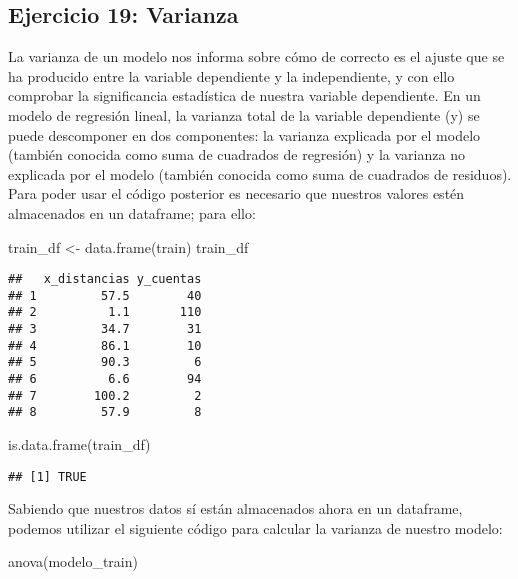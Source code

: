 \documentclass[
]{article}
\newenvironment{Shaded}{\begin{snugshade}}{\end{snugshade}}
\newcommand{\FunctionTok}[1]{\textcolor[rgb]{0.00,0.00,0.00}{#1}}
\newcommand{\NormalTok}[1]{#1}
\newcommand{\OtherTok}[1]{\textcolor[rgb]{0.56,0.35,0.01}{#1}}
\begin{document}
\hypertarget{ejercicio-19-varianza}{%
\subsection{Ejercicio 19: Varianza}\label{ejercicio-19-varianza}}

La varianza de un modelo nos informa sobre cómo de correcto es el ajuste
que se ha producido entre la variable dependiente y la independiente, y
con ello comprobar la significancia estadística de nuestra variable
dependiente. En un modelo de regresión lineal, la varianza total de la
variable dependiente (y) se puede descomponer en dos componentes: la
varianza explicada por el modelo (también conocida como suma de
cuadrados de regresión) y la varianza no explicada por el modelo
(también conocida como suma de cuadrados de residuos). Para poder usar
el código posterior es necesario que nuestros valores estén almacenados
en un dataframe; para ello:

\begin{Shaded}
\begin{Highlighting}[]
\NormalTok{train\_df }\OtherTok{\textless{}{-}} \FunctionTok{data.frame}\NormalTok{(train)}
\NormalTok{train\_df}
\end{Highlighting}
\end{Shaded}

\begin{verbatim}
##   x_distancias y_cuentas
## 1         57.5        40
## 2          1.1       110
## 3         34.7        31
## 4         86.1        10
## 5         90.3         6
## 6          6.6        94
## 7        100.2         2
## 8         57.9         8
\end{verbatim}

\begin{Shaded}
\begin{Highlighting}[]
\FunctionTok{is.data.frame}\NormalTok{(train\_df)}
\end{Highlighting}
\end{Shaded}

\begin{verbatim}
## [1] TRUE
\end{verbatim}

Sabiendo que nuestros datos sí están almacenados ahora en un dataframe,
podemos utilizar el siguiente código para calcular la varianza de
nuestro modelo:

\begin{Shaded}
\begin{Highlighting}[]
\FunctionTok{anova}\NormalTok{(modelo\_train)}
\end{Highlighting}
\end{Shaded}
\end{document}
